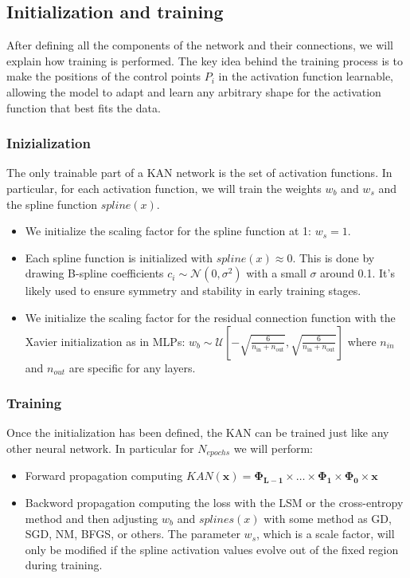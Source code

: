 \subsection{Initialization and training}
After defining all the components of the network and their connections, we will explain how training is performed. The key idea behind the training process is to make the positions of the control points $P_i$ in the activation function learnable, allowing the model to adapt and learn any arbitrary shape for the activation function that best fits the data. \cite{KAN,kan_intro}

\subsubsection{Inizialization}
The only trainable part of a KAN network is the set of activation functions. In particular, for each activation function, we will train the weights $w_b$ and $w_s$ and the spline function $spline(x)$. 
\begin{itemize}
    \item We initialize the scaling factor for the spline function at 1: $w_s=1$. 
    \item Each spline function is initialized with $spline(x) \approx 0$.  This is done by drawing B-spline coefficients $c_i \sim \mathcal{N}(0, \sigma^2)$ with a small $\sigma$ around 0.1. It's likely used to ensure symmetry and stability in early training stages.
    \item We initialize the scaling factor for the residual connection function with the Xavier initialization as in MLPs: $w_b \sim \mathcal{U}\left[-\sqrt{\frac{6}{n_{\text{in}} + n_{\text{out}}}}, \sqrt{\frac{6}{n_{\text{in}} + n_{\text{out}}}}\right]$ where $n_{in}$ and $n_{out}$ are specific for any layers.
\end{itemize}

\subsubsection{Training}
Once the initialization has been defined, the KAN can be trained just like any other neural network. In particular for $N_{epochs}$ we will perform:
\begin{itemize}
    \item Forward propagation computing $KAN(\textbf{x}) = \boldsymbol{\Phi_{L-1}} \times \dots \times \boldsymbol{\Phi_{1}} \times \boldsymbol{\Phi_{0}} \times \textbf{x}$
    \item Backword propagation computing the loss with the LSM or the cross-entropy method and then adjusting $w_b$ and $ splines(x)$ with some method as GD, SGD, NM, BFGS, or others. The parameter $w_s$, which is a scale factor, will only be modified if the spline activation values evolve out of the fixed region during training.
\end{itemize}

